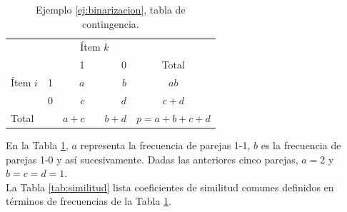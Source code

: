 \documentclass[a4paper, 20pt]{article}
\begin{document}
\begin{table}[H]
  \centering
  \caption{Ejemplo \ref{ej:binarizacion}, tabla de contingencia.}
  \label{tab:contingencia}
\resizebox{7cm}{!} {
  \begin{tabular}{llrrrrr}
    \toprule
\multicolumn{2}{l}{\multirow{2}{*}{}} & \multicolumn{3}{c}{Ítem $k$} & \multicolumn{2}{c}{} \\\cmidrule{3-5}
\multicolumn{2}{l}{}                  & 1        &       & 0       & \multicolumn{2}{c}{{Total}}                        \\
\midrule
{Ítem $i$}       & 1      & $a$        &       & $b$       & \multicolumn{2}{c}{$ab$}                     \\
                              & 0      & $c$        &       & $d$       & \multicolumn{2}{c}{$c+d$}                     \\ \midrule
\multicolumn{2}{l}{Total}            & $a+c$      &       & $b+d$     & \multicolumn{2}{c}{$p=a+b+c+d$}\\
\bottomrule
\end{tabular}
}
\end{table}

En la Tabla \ref{tab:contingencia}, $a$ representa la frecuencia de parejas 1-1, $b$ es la frecuencia de parejas 1-0 y así sucesivamente. Dadas las anteriores cinco parejas, $a=2$ y $b=c=d=1$.\\

La Tabla \ref{tab:similitud} lista coeficientes de similitud comunes definidos en términos de frecuencias de la Tabla \ref{tab:contingencia}.
\end{document}
